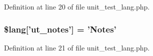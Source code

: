 Definition at line 20 of file unit\-\_\-test\-\_\-lang.\-php.

\hypertarget{unit__test__lang_8php_a4d80b77ed0c51d05d5abdc88afa1b540}{
\subsubsection[{\$lang}]{\setlength{\rightskip}{0pt plus 5cm}\$lang\mbox{[}'ut\-\_\-notes'\mbox{]} = 'Notes'}}\label{unit__test__lang_8php_a4d80b77ed0c51d05d5abdc88afa1b540}


Definition at line 21 of file unit\-\_\-test\-\_\-lang.\-php.

